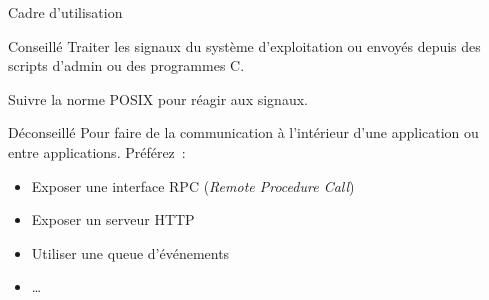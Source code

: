 \begin{frame}{Cadre d'utilisation}
  \begin{exampleblock}{Conseillé}
    Traiter les signaux du système d'exploitation ou envoyés depuis des scripts d'admin ou des programmes C.

    Suivre la norme POSIX pour réagir aux signaux.
  \end{exampleblock}

  \begin{alertblock}{Déconseillé}
    Pour faire de la communication à l'intérieur d'une application ou entre applications. Préférez~:

    \begin{itemize}
      \item Exposer une interface RPC (\emph{Remote Procedure Call})
      \item Exposer un serveur HTTP
      \item Utiliser une queue d'événements
      \item …
    \end{itemize}
  \end{alertblock}
\end{frame}
